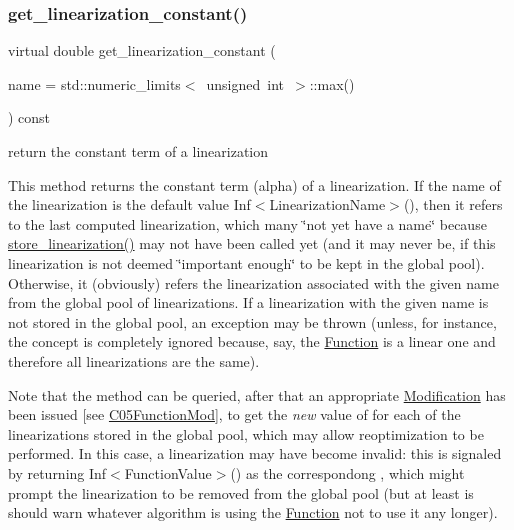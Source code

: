 \subsubsection{\texorpdfstring{get\+\_\+linearization\+\_\+constant()}{get\_linearization\_constant()}}
{\footnotesize\ttfamily virtual double get\+\_\+linearization\+\_\+constant (\begin{DoxyParamCaption}\item[{const \mbox{\hyperlink{class_s_m_spp__di__unipi__it_1_1_c05_function_ae90bf93c6d4b4ada66791c735d1c03cc}{Linearization\+Name}}}]{name = {\ttfamily std\+:\+:numeric\+\_\+limits$<$~unsigned~int~$>$\+:\+:max()} }\end{DoxyParamCaption}) const\hspace{0.3cm}{\ttfamily [pure virtual]}}



return the constant term of a linearization 

This method returns the constant term (alpha) of a linearization. If the name of the linearization is the default value Inf$<$\+Linearization\+Name$>$(), then it refers to the last computed linearization, which many \char`\"{}not yet
have a name\char`\"{} because \mbox{\hyperlink{class_s_m_spp__di__unipi__it_1_1_c05_function_ac477d0c3276fa28127d5aff69f31c367}{store\+\_\+linearization()}} may not have been called yet (and it may never be, if this linearization is not deemed \char`\"{}important
enough\char`\"{} to be kept in the global pool). Otherwise, it (obviously) refers the linearization associated with the given name from the global pool of linearizations. If a linearization with the given name is not stored in the global pool, an exception may be thrown (unless, for instance, the concept is completely ignored because, say, the \mbox{\hyperlink{class_s_m_spp__di__unipi__it_1_1_function}{Function}} is a linear one and therefore all linearizations are the same).

Note that the method can be queried, after that an appropriate \mbox{\hyperlink{class_s_m_spp__di__unipi__it_1_1_modification}{Modification}} has been issued \mbox{[}see \mbox{\hyperlink{class_s_m_spp__di__unipi__it_1_1_c05_function_mod}{C05\+Function\+Mod}}\mbox{]}, to get the {\itshape new} value of  for each of the linearizations stored in the global pool, which may allow reoptimization to be performed. In this case, a linearization may have become invalid\+: this is signaled by returning Inf$<$\+Function\+Value$>$() as the correspondong , which might prompt the linearization to be removed from the global pool (but at least is should warn whatever algorithm is using the \mbox{\hyperlink{class_s_m_spp__di__unipi__it_1_1_function}{Function}} not to use it any longer). 

